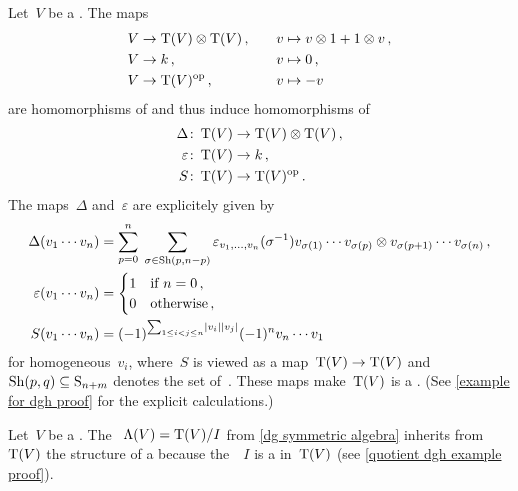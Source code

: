\documentclass[a4paper,10pt,headings=standardclasses]{scrartcl}
\begin{document}
\begin{example}
  \label{example for dgh}
  Let~$V$ be a {\dgv}.
  The maps
  \begin{alignat*}{3}
    V
    &\to
    \operatorname{T}(V) \otimes \operatorname{T}(V) \,,
    &
    \quad
    v
    &\mapsto
    v \otimes 1 + 1 \otimes v \,,
    \\
    V
    &\to
    k \,,
    &
    \quad
    v
    &\mapsto
    0 \,,
    \\
    V
    &\to
    \operatorname{T}(V)^{\mathrm{op}} \,,
    &
    \quad
    v
    &\mapsto
    -v
  \end{alignat*}
  are homomorphisms of {\dgvs} and thus induce homomorphisms of {\dgas}
  \begin{align*}
    \Delta
    \colon
    \operatorname{T}(V)
    &\to
    \operatorname{T}(V) \otimes \operatorname{T}(V) \,,
    \\
    \varepsilon
    \colon
    \operatorname{T}(V)
    &\to
    k \,,
    \\
    S
    \colon
    \operatorname{T}(V)
    &\to
    \operatorname{T}(V)^{\mathrm{op}} \,.
  \end{align*}
  The maps~$\Delta$ and~$\varepsilon$ are explicitely given by
  \begin{align*}
    \Delta(v_1 \dotsm v_n)
    &=
    \sum_{p=0}^n
    \;
    \sum_{\sigma \in \operatorname{Sh}(p,n-p)}
    \varepsilon_{v_1, \dotsc, v_n}(\sigma^{-1})
    v_{\sigma(1)} \dotsm v_{\sigma(p)}
    \otimes
    v_{\sigma(p+1)} \dotsm v_{\sigma(n)} \,,
    \\
    \varepsilon( v_1 \dotsm v_n )
    &=
    \begin{cases}
      1 & \text{if~$n = 0$} \,, \\
      0 & \text{otherwise} \,,
    \end{cases}
    \\
    S(v_1 \dotsm v_n)
    &=
    (-1)^{\sum_{1 \leq i < j \leq n} \lvert v_i\rvert \lvert v_j\rvert}
    (-1)^n
    v_n \dotsm v_1
  \end{align*}
  for homogeneous~$v_i$, where~$S$ is viewed as a map~$\operatorname{T}(V) \to \operatorname{T}(V)$ and~$\operatorname{Sh}(p,q) \subseteq \operatorname{S}_{n+m}$ denotes the set of~{}.
  These maps make~$\operatorname{T}(V)$ is a {\dgh}.
  (See \cref{example for dgh proof} for the explicit calculations.)
\end{example}

\begin{example}
  \label{quotient dgh example}
  Let~$V$ be a {\dgv}.
  The {\dga}~$\operatorname{\Lambda}(V) = \operatorname{T}(V)/I$ from \cref{dg symmetric algebra} inherits from~$\operatorname{T}(V)$ the structure of a {\dgh} because the~{\dgi}~$I$ is a {\dghi} in~$\operatorname{T}(V)$ (see \cref{quotient dgh example proof}).
\end{example}
\end{document}
